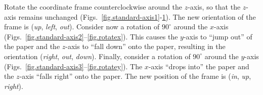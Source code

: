 Rotate the coordinate frame counterclockwise around the $z$-axis, so that the $z$-axis remains unchanged (Figs.~\ref{fig.standard-axis1}-\ref{fig.rotatez}). The new orientation of the frame is (\textit{up}, \textit{left}, \textit{out}). Consider now a rotation of $90^\circ$ around the $x$-axis (Figs.~\ref{fig.standard-axis2}--\ref{fig.rotatex}). This causes the $y$-axis to ``jump out'' of the paper and the $z$-axis to ``fall down'' onto the paper, resulting in the orientation (\textit{right}, \textit{out}, \textit{down}). Finally, consider a rotation of $90^\circ$ around the $y$-axis (Figs.~\ref{fig.standard-axis3}--\ref{fig.rotatey}). The $x$-axis ``drops into'' the paper and the $z$-axis ``falls right'' onto the paper. The new position of the frame is (\textit{in}, \textit{up}, \textit{right}).

\begin{figure}
\subfigures
\begin{minipage}{\textwidth}
\hspace{\fill}
\label{fig.standard-axis1}
\label{fig.rotatez}
\end{minipage}
\end{figure}


